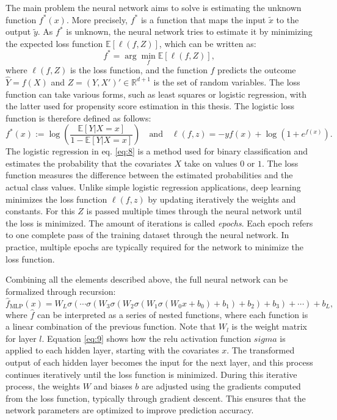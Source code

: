 The main problem the neural network aims to solve is estimating the unknown function $f^*(x)$.
More precisely, $f^*$ is a function that maps the input $\tilde{x}$ to the output $\tilde{y}$.
As $f^*$ is unknown, the neural network tries to estimate it by minimizing the expected loss function $\mathbb{E}[\ell(f, Z)]$, which can be written as:
\begin{equation}
f^* = \arg \min_f \mathbb{E}[\ell(f, Z)],
\end{equation}
where $\ell(f, Z)$ is the loss function, and the function $f$ predicts the outcome $\hat{Y} = f(X)$ and $Z = (Y, X')' \in \mathbb{R}^{d+1}$ is the set of random variables.
The loss function can take various forms, such as least squares or logistic regression, with the latter used for propensity score estimation in this thesis.
The logistic loss function is therefore defined as follows:
\begin{equation}
f^*(x) := \log \left( \frac{\mathbb{E}[Y|X = x]}{1 - \mathbb{E}[Y|X = x]} \right) \quad \text{and} \quad \ell(f, z) = -yf(x) + \log(1 + e^{f(x)}).
\label{eq:8}
\end{equation}
The logistic regression in eq. \ref*{eq:8} is a method used for binary classification and estimates the probability that the covariates $X$ take on values $0$ or $1$.
The loss function measures the difference between the estimated probabilities and the actual class values.
Unlike simple logistic regression applications, deep learning minimizes the loss function $\ell(f, z)$ by updating iteratively the weights and constants.
For this $Z$ is passed multiple times through the neural network until the loss is minimized.
The amount of iterations is called \textit{epochs}.
Each epoch refers to one complete pass of the training dataset through the neural network.
In practice, multiple epochs are typically required for the network to minimize the loss function.

Combining all the elements described above, the full neural network can be formalized through recursion:
\begin{equation}
\hat{f}_{\text{MLP}}(x) = W_L \sigma \left( \cdots \sigma \left( W_3 \sigma \left( W_2 \sigma \left( W_1 \sigma \left( W_0 x + b_0 \right) + b_1 \right) + b_2 \right) + b_3 \right) + \cdots \right) + b_L,
\label{eq:9}
\end{equation}
where $\hat{f}$ can be interpreted as a series of nested functions, where each function is a linear combination of the previous function.
Note that $W_l$ is the weight matrix for layer $l$.
Equation \ref{eq:9} shows how the \ac{relu} activation function $sigma$ is applied to each hidden layer, starting with the covariates $x$.
The transformed output of each hidden layer becomes the input for the next layer, and this process continues iteratively until the loss function is minimized.
During this iterative process, the weights $W$ and biases $b$ are adjusted using the gradients computed from the loss function, typically through gradient descent.
This ensures that the network parameters are optimized to improve prediction accuracy.

